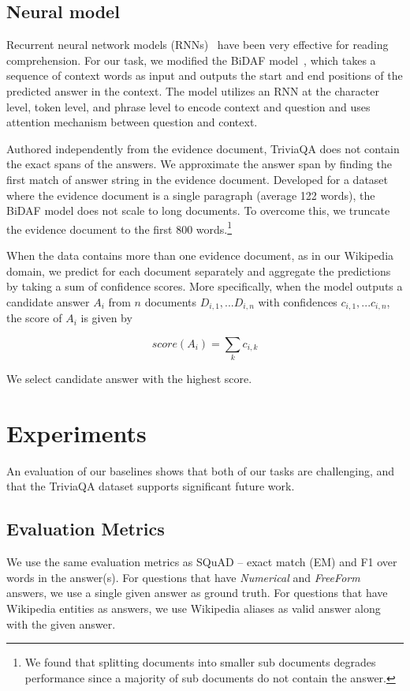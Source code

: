 \subsection{Neural model} Recurrent neural network models (RNNs)~\cite{Hermann:15, chen2016thorough} have been very effective for reading comprehension. For our task, we modified the BiDAF model~\cite{SeoKFH16}, which takes a sequence of context words as input and outputs the start and end positions of the predicted answer in the context. The model utilizes an RNN at the character level, token level, and phrase level to encode context and question and uses attention mechanism between question and context.

Authored independently from the evidence document, TriviaQA does not contain the exact spans of the answers. We approximate the answer span by finding the first match of answer string in the evidence document. Developed for a dataset where the evidence document is a single paragraph (average 122 words), the BiDAF model does not scale to long documents. To overcome this, we truncate the evidence document to the first 800 words.\footnote{We found that splitting documents into smaller sub documents degrades performance since a majority of sub documents do not contain the answer.} 

When the data contains more than one evidence document, as in our Wikipedia domain, we predict for each document separately and aggregate the predictions by taking a sum of confidence scores. More specifically, when the model outputs a candidate answer $A_i$ from $n$ documents $D_{i, 1}, ... D_{i, n}$ with confidences ${c_{i, 1}, ... c_{i, n} }$, the score of $A_i$ is given by

\begin{equation*}
    score(A_i) = \sum_k c_{i,k}   
    \end{equation*}

We select candidate answer with the highest score.  

\section{Experiments}
\label{experiments}

An evaluation of our baselines shows that both of our tasks are challenging, and that the TriviaQA dataset supports significant future work.

\label{sec:eval_metrics}
\subsection{Evaluation Metrics} We use the same evaluation metrics as SQuAD -- exact match (EM) and F1 over words in the answer(s). For questions that have \emph{Numerical} and \emph{FreeForm} answers, we use a single given answer as ground truth. For questions that have Wikipedia entities as answers, we use Wikipedia aliases as valid answer along with the given answer.

